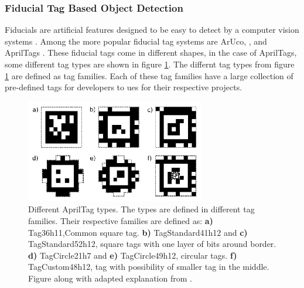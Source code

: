 \subsubsection{Fiducial Tag Based Object Detection }\label{sec:T:OD:TagBasedObjectDetection}
Fiducials are artificial features designed to be easy to detect by a computer vision systems \cite{krogius2019iros}. Among the more popular fiducial tag systems are ArUco, \cite{JuardoSalinas2016} \cite{RamirezSalinas2018},  and AprilTags \cite{olson2011tags} \cite{wang2016iros} \cite{krogius2019iros}. These fiducial tags come in different shapes, in the case of AprilTags, some different tag types are shown in figure \ref{fig:T:PAP:MV:AprilTag}. The differnt tag types from figure \ref{fig:T:PAP:MV:AprilTag} are defined as tag families. Each of these tag families have a large collection of pre-defined tags for developers to ues for their respective projects.

\begin{figure}[htp]
  \centering
  \includegraphics[width = 0.7\textwidth]{Figures/figAprilTag.pdf}
  \caption{Different AprilTag types. The types are defined in different tag families. Their respective families are defined as: \textbf{a)} Tag36h11,Common square tag. \textbf{b)} TagStandard41h12 and \textbf{c)} TagStandard52h12, square tags with one layer of bits around border. \textbf{d)} TagCircle21h7 and \textbf{e)} TagCircle49h12, circular tags. \textbf{f)} TagCustom48h12, tag with possibility of smaller tag in the middle. Figure along with adapted explanation from \cite{krogius2019iros}.}
  \label{fig:T:PAP:MV:AprilTag}
\end{figure}




